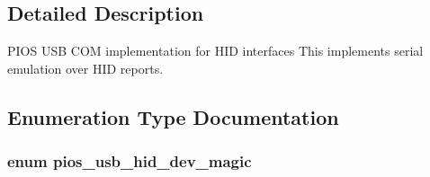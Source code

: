 \subsection{\-Detailed \-Description}
\-P\-I\-O\-S \-U\-S\-B \-C\-O\-M implementation for \-H\-I\-D interfaces  \-This implements serial emulation over \-H\-I\-D reports. 

\subsection{\-Enumeration \-Type \-Documentation}
\hypertarget{group___p_i_o_s___u_s_b___h_i_d_ga7769ddfbb58cbf13d0e0662f4d441899}{
\subsubsection[{pios\-\_\-usb\-\_\-hid\-\_\-dev\-\_\-magic}]{\setlength{\rightskip}{0pt plus 5cm}enum {\bf pios\-\_\-usb\-\_\-hid\-\_\-dev\-\_\-magic}}}\label{group___p_i_o_s___u_s_b___h_i_d_ga7769ddfbb58cbf13d0e0662f4d441899}
